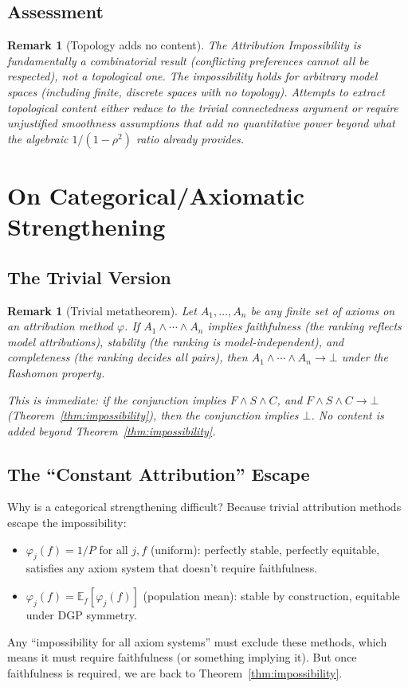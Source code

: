 \documentclass{article}
\newtheorem{remark}[theorem]{Remark}
\newcommand{\E}{\mathbb{E}}
\begin{document}
\subsection{Assessment}

\begin{remark}[Topology adds no content]
\label{rem:topology-trivial}
The Attribution Impossibility is fundamentally a \emph{combinatorial}
result (conflicting preferences cannot all be respected), not a
\emph{topological} one. The impossibility holds for arbitrary model
spaces (including finite, discrete spaces with no topology). Attempts
to extract topological content either reduce to the trivial
connectedness argument or require unjustified smoothness assumptions
that add no quantitative power beyond what the algebraic
$1/(1-\rho^2)$ ratio already provides.
\end{remark}

\section{On Categorical/Axiomatic Strengthening}

\subsection{The Trivial Version}

\begin{remark}[Trivial metatheorem]
Let $A_1, \ldots, A_n$ be any finite set of axioms on an
attribution method $\varphi$. If $A_1 \wedge \cdots \wedge A_n$
implies faithfulness (the ranking reflects model attributions),
stability (the ranking is model-independent), and completeness
(the ranking decides all pairs), then
$A_1 \wedge \cdots \wedge A_n \to \bot$ under the Rashomon property.

This is immediate: if the conjunction implies $F \wedge S \wedge C$,
and $F \wedge S \wedge C \to \bot$ (Theorem~\ref{thm:impossibility}), then the conjunction
implies $\bot$. No content is added beyond Theorem~\ref{thm:impossibility}.
\end{remark}

\subsection{The ``Constant Attribution'' Escape}

Why is a categorical strengthening difficult? Because trivial attribution methods escape the impossibility:
\begin{itemize}
    \item $\varphi_j(f) = 1/P$ for all $j, f$ (uniform): perfectly stable, perfectly equitable, satisfies any axiom system that doesn't require faithfulness.
    \item $\varphi_j(f) = \E_f[\varphi_j(f)]$ (population mean): stable by construction, equitable under DGP symmetry.
\end{itemize}
Any ``impossibility for all axiom systems'' must exclude these methods, which means it must require faithfulness (or something implying it). But once faithfulness is required, we are back to Theorem~\ref{thm:impossibility}.
\end{document}
